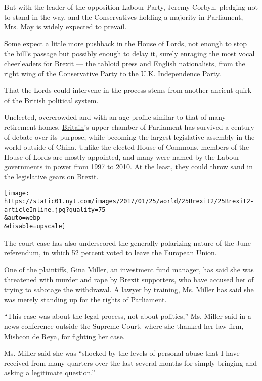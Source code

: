 But with the leader of the opposition Labour Party, Jeremy Corbyn,
pledging not to stand in the way, and the Conservatives holding a
majority in Parliament, Mrs. May is widely expected to prevail.

Some expect a little more pushback in the House of Lords, not enough to
stop the bill's passage but possibly enough to delay it, surely enraging
the most vocal cheerleaders for Brexit --- the tabloid press and English
nationalists, from the right wing of the Conservative Party to the U.K.
Independence Party.

That the Lords could intervene in the process stems from another ancient
quirk of the British political system.

Unelected, overcrowded and with an age profile similar to that of many
retirement homes,
\href{http://topics.nytimes.com/top/news/international/countriesandterritories/unitedkingdom/index.html?inline=nyt-geo}{Britain}'s
upper chamber of Parliament has survived a century of debate over its
purpose, while becoming the largest legislative assembly in the world
outside of China. Unlike the elected House of Commons, members of the
House of Lords are mostly appointed, and many were named by the Labour
governments in power from 1997 to 2010. At the least, they could throw
sand in the legislative gears on Brexit.

\texttt{[image: https://static01.nyt.com/images/2017/01/25/world/25Brexit2/25Brexit2-articleInline.jpg?quality=75\\\&auto=webp\\\&disable=upscale]}

The court case has also underscored the generally polarizing nature of
the June referendum, in which 52 percent voted to leave the European
Union.

One of the plaintiffs, Gina Miller, an investment fund manager, has said
she was threatened with murder and rape by Brexit supporters, who have
accused her of trying to sabotage the withdrawal. A lawyer by training,
Ms. Miller has said she was merely standing up for the rights of
Parliament.

``This case was about the legal process, not about politics,'' Ms.
Miller said in a news conference outside the Supreme Court, where she
thanked her law firm,
\href{https://www.mishcon.com/news/firm_news/article_50_legal_challenge_supreme_court_upholds_high_court_decision_01_2017}{Mishcon
de Reya}, for fighting her case.

Ms. Miller said she was ``shocked by the levels of personal abuse that I
have received from many quarters over the last several months for simply
bringing and asking a legitimate question.''

